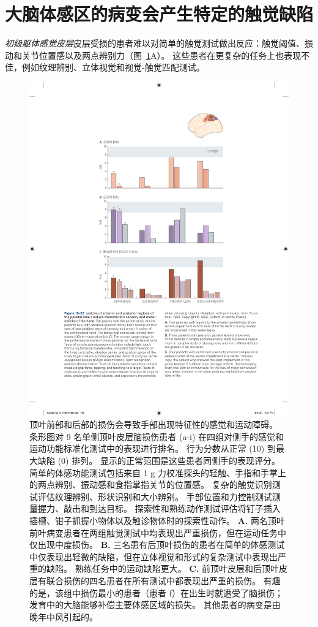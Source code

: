 \section{大脑体感区的病变会产生特定的触觉缺陷}

\textit{初级躯体感觉皮层}皮层受损的患者难以对简单的触觉测试做出反应：触觉阈值、振动和关节位置感以及两点辨别力（图~\ref{fig:19_22}A）。
这些患者在更复杂的任务上也表现不佳，例如纹理辨别、立体视觉和视觉-触觉匹配测试。


\begin{figure}[htbp]
	\centering
	\includegraphics[width=0.8\linewidth]{chap19/fig_19_22}
	\caption{顶叶前部和后部的损伤会导致手部出现特征性的感觉和运动障碍。
		条形图对 9 名单侧顶叶皮层脑损伤患者 (a-i) 在四组对侧手的感觉和运动功能标准化测试中的表现进行排名。
		行为分数从正常 (10) 到最大缺陷 (0) 排列。
		显示的正常范围是这些患者同侧手的表现评分。
		简单的体感功能测试包括来自 1 g 力校准探头的轻触、手指和手掌上的两点辨别、振动感和食指掌指关节的位置感。
		复杂的触觉识别测试评估纹理辨别、形状识别和大小辨别。
		手部位置和力控制测试测量握力、敲击和到达目标。
		探索性和熟练动作测试评估将钉子插入插槽、钳子抓握小物体以及触诊物体时的探索性动作\cite{pause1989sensorimotor}。
		\textbf{A.} 两名顶叶前叶病变患者在两组触觉测试中均表现出严重损伤，但在运动任务中仅出现中度损伤。
		\textbf{B.} 三名患有后顶叶损伤的患者在简单的体感测试中仅表现出轻微的缺陷，但在立体视觉和形式的复杂测试中表现出严重的缺陷。
		熟练任务中的运动缺陷更大。
		\textbf{C.} 前顶叶皮层和后顶叶皮层有联合损伤的四名患者在所有测试中都表现出严重的损伤。
		有趣的是，该组中损伤最小的患者（患者 f）在出生时就遭受了脑损伤；
		发育中的大脑能够补偿主要体感区域的损失。
		其他患者的病变是由晚年中风引起的。}
	\label{fig:19_22}
\end{figure}


